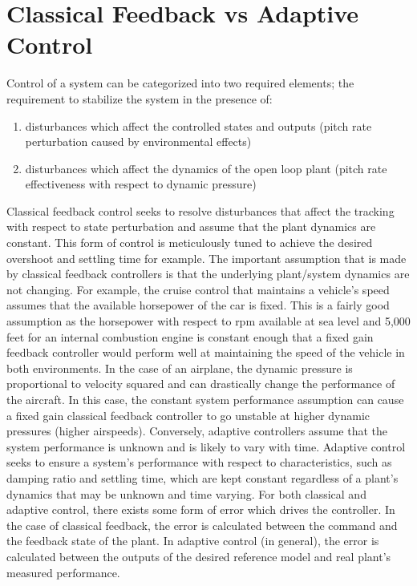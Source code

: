 \section{Classical Feedback vs Adaptive Control}
Control of a system can be categorized into two required elements; the requirement to stabilize the system in the presence of:
\begin{enumerate}
 \item disturbances which affect the controlled states and outputs (pitch rate perturbation caused by environmental effects)
 \item disturbances which affect the dynamics of the open loop plant (pitch rate effectiveness with respect to dynamic pressure)
\end{enumerate}
Classical feedback control seeks to resolve disturbances that affect the tracking with respect to state perturbation and assume that the plant dynamics are constant.  This form of control is meticulously tuned to achieve the desired overshoot and settling time for example.  The important assumption that is made by classical feedback controllers is that the underlying plant/system dynamics are not changing.  For example, the cruise control that maintains a vehicle's speed assumes that the available horsepower of the car is fixed.  This is a fairly good assumption as the horsepower with respect to rpm available at sea level and 5,000 feet for an internal combustion engine is constant enough that a fixed gain feedback controller would perform well at maintaining the speed of the vehicle in both environments.  In the case of an airplane, the dynamic pressure is proportional to velocity squared and can drastically change the performance of the aircraft.  In this case, the constant system performance assumption can cause a fixed gain classical feedback controller to go unstable at higher dynamic pressures (higher airspeeds).   Conversely, adaptive controllers assume that the system performance is unknown and is likely to vary with time.  Adaptive control seeks to ensure a system's performance with respect to characteristics, such as damping ratio and settling time, which are kept constant regardless of a plant's dynamics that may be unknown and time varying.  For both classical and adaptive control, there exists some form of error which drives the controller.  In the case of classical feedback, the error is calculated between the command and the feedback state of the plant. In adaptive control (in general), the error is calculated between the outputs of the desired reference model and real plant's measured performance.

